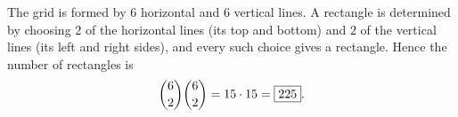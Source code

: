 The grid is formed by $6$ horizontal and $6$ vertical lines. A rectangle is determined by choosing $2$ of the horizontal lines (its top and bottom) and $2$ of the vertical lines (its left and right sides), and every such choice gives a rectangle. Hence the number of rectangles is
\[\dbinom62\dbinom62=15\cdot15=\boxed{225}.\]
